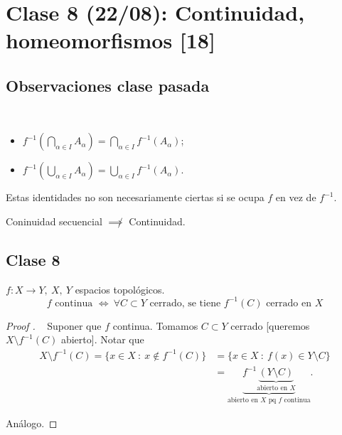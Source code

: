 
	\section{Clase 8 (22/08): Continuidad, homeomorfismos [18]}

	\subsection{Observaciones clase pasada}

	\begin{remark}~
		\begin{itemize}
			\item $f^{-1}\left( \displaystyle\bigcap_{\alpha\in I} A_{\alpha} \right) = \displaystyle\bigcap_{\alpha\in I} f^{-1}(A_{\alpha})$;

			\item $f^{-1}\left( \displaystyle\bigcup_{\alpha \in I} A_{\alpha} \right) = \displaystyle\bigcup_{\alpha \in I} f^{-1}(A_{\alpha})$.
		\end{itemize}
		\noindent Estas identidades no son necesariamente ciertas si se ocupa $f$ en vez de $f^{-1}$.
	\end{remark}

	\begin{remark}[Tarea 2]
		Coninuidad secuencial $\not\implies$ Continuidad.
	\end{remark}

	\subsection{Clase 8}

	\begin{lemma}
		$f:X\to Y,\ X,\ Y$ espacios topológicos.
		\[ f \text{ continua } \iff \ \forall C \subset Y \text{ cerrado, se tiene } f^{-1}(C) \text{ cerrado en } X \]
	\end{lemma}
	\begin{proof}[Proof ]~
		\Onlyifstep Suponer que $f$ continua. Tomamos $C \subset Y$ cerrado [queremos $X\setminus f^{-1}(C)$ abierto]. Notar que
		\begin{align*}
			X\setminus f^{-1}(C) = \{ x \in X \ : \ x \not\in f^{-1}(C) \} & = \{ x \in X \ : \ f(x) \in Y\setminus C \} \\
			& = \underbrace{f^{-1}\underbrace{(Y\setminus C)}_{\text{abierto en } X}}_{\text{abierto en } X \text{ pq } f \text{ continua}}
		.\end{align*}
		
		\noindent \Ifstep Análogo.
	\end{proof}

